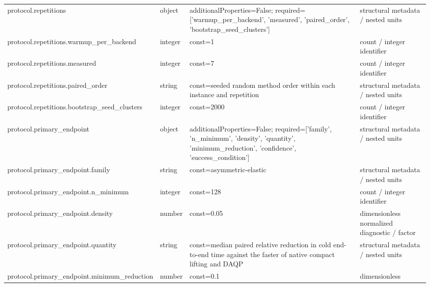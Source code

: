 \begin{longtable}{@{}>{\raggedright\arraybackslash}p{}>{\raggedright\arraybackslash}p{}>{\raggedright\arraybackslash}p{}>{\raggedright\arraybackslash}p{}@{}}
protocol.\allowbreak{}repetitions & object & additionalProperties=\allowbreak{}False; required=\allowbreak{}['warmup\_\allowbreak{}per\_\allowbreak{}backend', 'measured', 'paired\_\allowbreak{}order', 'bootstrap\_\allowbreak{}seed\_\allowbreak{}clusters'] & structural metadata /\allowbreak{} nested units\\
protocol.\allowbreak{}repetitions.\allowbreak{}warmup\_\allowbreak{}per\_\allowbreak{}backend & integer & const=\allowbreak{}1 & count /\allowbreak{} integer identifier\\
protocol.\allowbreak{}repetitions.\allowbreak{}measured & integer & const=\allowbreak{}7 & count /\allowbreak{} integer identifier\\
protocol.\allowbreak{}repetitions.\allowbreak{}paired\_\allowbreak{}order & string & const=\allowbreak{}seeded random method order within each instance and repetition & structural metadata /\allowbreak{} nested units\\
protocol.\allowbreak{}repetitions.\allowbreak{}bootstrap\_\allowbreak{}seed\_\allowbreak{}clusters & integer & const=\allowbreak{}2000 & count /\allowbreak{} integer identifier\\
protocol.\allowbreak{}primary\_\allowbreak{}endpoint & object & additionalProperties=\allowbreak{}False; required=\allowbreak{}['family', 'n\_\allowbreak{}minimum', 'density', 'quantity', 'minimum\_\allowbreak{}reduction', 'confidence', 'success\_\allowbreak{}condition'] & structural metadata /\allowbreak{} nested units\\
protocol.\allowbreak{}primary\_\allowbreak{}endpoint.\allowbreak{}family & string & const=\allowbreak{}asymmetric-\allowbreak{}elastic & structural metadata /\allowbreak{} nested units\\
protocol.\allowbreak{}primary\_\allowbreak{}endpoint.\allowbreak{}n\_\allowbreak{}minimum & integer & const=\allowbreak{}128 & count /\allowbreak{} integer identifier\\
protocol.\allowbreak{}primary\_\allowbreak{}endpoint.\allowbreak{}density & number & const=\allowbreak{}0.\allowbreak{}05 & dimensionless normalized diagnostic /\allowbreak{} factor\\
protocol.\allowbreak{}primary\_\allowbreak{}endpoint.\allowbreak{}quantity & string & const=\allowbreak{}median paired relative reduction in cold end-\allowbreak{}to-\allowbreak{}end time against the faster of native compact lifting and DAQP & structural metadata /\allowbreak{} nested units\\
protocol.\allowbreak{}primary\_\allowbreak{}endpoint.\allowbreak{}minimum\_\allowbreak{}reduction & number & const=\allowbreak{}0.\allowbreak{}1 & dimensionless\\

\end{longtable}
